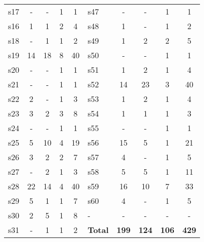 \begin{longtable}{ l c c c c | l c c c c }
s17 & - & - & 1 & 1 & s47 & - & - & 1 & 1 \\
s16 & 1 & 1 & 2 & 4 & s48 & 1 & - & 1 & 2 \\
s18 & - & 1 & 1 & 2 & s49 & 1 & 2 & 2 & 5 \\
s19 & 14 & 18 & 8 & 40 & s50 & - & - & 1 & 1 \\
s20 & - & - & 1 & 1 & s51 & 1 & 2 & 1 & 4 \\
s21 & - & - & 1 & 1 & s52 & 14 & 23 & 3 & 40 \\
s22 & 2 & - & 1 & 3 & s53 & 1 & 2 & 1 & 4 \\
s23 & 3 & 2 & 3 & 8 & s54 & 1 & 1 & 1 & 3 \\
s24 & - & - & 1 & 1 & s55 & - & - & 1 & 1 \\
s25 & 5 & 10 & 4 & 19 & s56 & 15 & 5 & 1 & 21 \\
s26 & 3 & 2 & 2 & 7 & s57 & 4 & - & 1 & 5 \\
s27 & - & 2 & 1 & 3 & s58 & 5 & 5 & 1 & 11 \\
s28 & 22 & 14 & 4 & 40 & s59 & 16 & 10 & 7 & 33 \\
s29 & 5 & 1 & 1 & 7 & s60 & 4 & - & 1 & 5 \\
s30 & 2 & 5 & 1 & 8 & - & - & - & - & - \\
s31 & - & 1 & 1 & 2 & {\bf Total} & {\bf 199} & {\bf 124} & {\bf 106} & {\bf 429} \\
\end{longtable}
